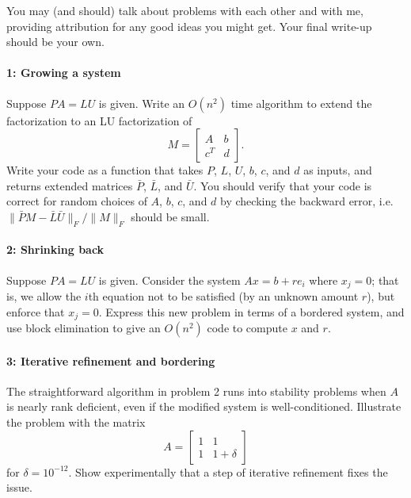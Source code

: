\documentclass[12pt, leqno]{article} %
\begin{document}

You may (and should) talk about problems with each other and with me,
providing attribution for any good ideas you might get.  Your final
write-up should be your own.

\paragraph*{1: Growing a system}
Suppose $PA = LU$ is given.  Write an $O(n^2)$ time algorithm to
extend the factorization to an LU factorization of
\[
  M = \begin{bmatrix} A & b \\ c^T & d \end{bmatrix}.
\]
Write your code as a function that takes $P$, $L$, $U$, $b$, $c$, and
$d$ as inputs, and returns extended matrices $\bar{P}$, $\bar{L}$, and
$\bar{U}$.  You should verify that your code is correct for random
choices of $A$, $b$, $c$, and $d$ by checking the backward error,
i.e.~$\|\bar{P} M - \bar{L} \bar{U}\|_F / \|M\|_F$ should be small.

\paragraph*{2: Shrinking back}
Suppose $PA = LU$ is given.  Consider the system $Ax = b + r e_i$
where $x_j = 0$; that is, we allow the $i$th equation not to be
satisfied (by an unknown amount $r$), but enforce that $x_j = 0$.
Express this new problem in terms of a bordered system, and use
block elimination to give an $O(n^2)$ code to compute $x$ and $r$.

\paragraph*{3: Iterative refinement and bordering}
The straightforward algorithm in problem 2 runs into stability
problems when $A$ is nearly rank deficient, even if the modified
system is well-conditioned.  Illustrate the problem with the
matrix
\[
  A = \begin{bmatrix} 1 & 1 \\ 1 & 1+\delta \end{bmatrix}
\]
for $\delta = 10^{-12}$.  Show experimentally that a step of iterative
refinement fixes the issue.
\end{document}

